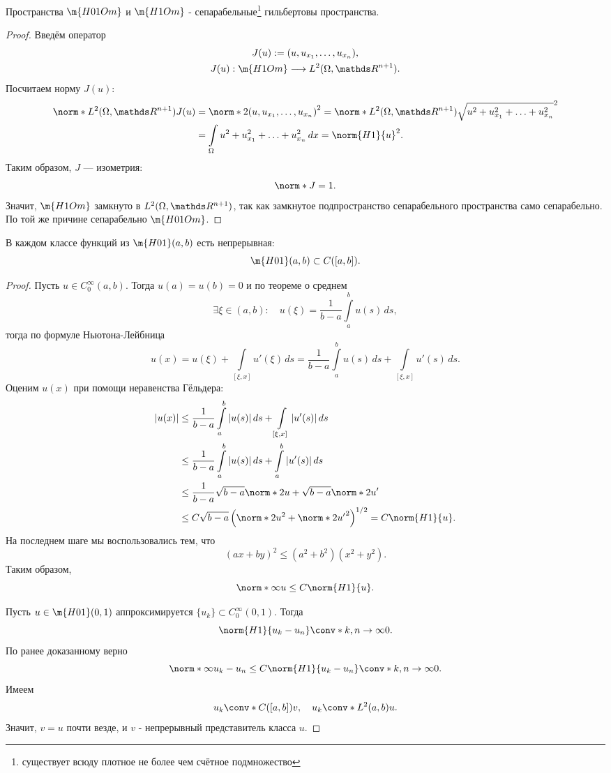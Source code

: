 \begin{theorem} Пространства $\m{H01Om}$ и  $\m{H1Om}$ - сепарабельные\footnote{существует всюду плотное не более чем счётное подмножество} гильбертовы пространства.
\end{theorem}
\begin{proof}
Введём оператор
\begin{gather*}
J(u) := (u, u_{x_1}, \hdots, u_{x_n}), \\ 
J(u):  \m{H1Om} \longrightarrow L^2(\Omega, \real^{n+1}).
\end{gather*}
Посчитаем норму $J(u)$:
\begin{align*}
	\norm*{L^2(\Omega, \real^{n+1})} {J(u)} &= \norm*{2}{(u, u_{x_1}, \hdots, u_{x_n})}^2 = \norm*{L^2(\Omega, \real^{n+1})}{\sqrt{u^2 + u_{x_1}^2 + \hdots + u_{x_n}^2 }}^2 \\
	&= \int \limits_\Omega u^2 + u_{x_1}^2 + \hdots + u_{x_n}^2 \, dx = \norm{H1}{u}^2.
\end{align*}
Таким образом, $J$ --- изометрия:
$$ \norm*{}{J} = 1.$$
Значит, $\m{H1Om}$ замкнуто в $L^2(\Omega, \real^{n+1})$, так как замкнутое подпространство сепарабельного пространства само сепарабельно. По той же причине сепарабельно $\m{H01Om}$.

\end{proof}

\begin{theorem} В каждом классе функций из $\m{H01}(a,b)$ есть непрерывная:
 $$ \m{H01}(a,b) \subset C([a,b]) .$$
\end{theorem}
\begin{proof}
Пусть $u \in C_0^\infty (a,b)$. Тогда $u(a) = u(b) = 0$ и по теореме о среднем
$$ \exists \xi \in (a,b): \quad u(\xi) = \frac{1}{b-a} \int \limits_a^b u(s) \, ds,$$
тогда по формуле Ньютона-Лейбница
$$ u(x) = u(\xi) + \int \limits_{[\xi, x]} u'(\xi) \, ds = \frac {1} {b-a} \int \limits_a^b u(s) \, ds + \int \limits_{[\xi, x]} u'(s) \, ds.$$
Оценим $u(x)$ при помощи неравенства Гёльдера:
\begin{align*}
|u(x)| &\leq \frac {1} {b-a} \int \limits_a^b |u(s)| \, ds + \int \limits_{[\xi, x]} |u'(s)| \, ds \\
&\leq \frac {1} {b-a} \int \limits_a^b |u(s)| \, ds + \int \limits_a^b |u'(s)| \, ds \\
&\leq \frac {1} {b-a} \sqrt{b-a} \norm*{2}{u} + \sqrt{b-a} \norm*{2}{u'} \\
&\leq C \sqrt{b-a} \left( \norm*{2}{u}^2 + \norm*{2}{u'}^2 \right)^{1/2} = C \norm{H1}{u}.
\end{align*}
На последнем шаге мы воспользовались тем, что
$$ (ax + by)^2 \leq (a^2 + b^2) (x^2 + y^2).$$
Таким образом,
$$ \norm*{\infty}{u} \leq C \norm{H1}{u}.$$

Пусть $u \in \m{H01} (0,1)$ аппроксимируется $\{ u_k \} \subset C_0^\infty (0,1)$. Тогда
$$ \norm{H1}{u_k - u_n} \conv*{}{k,n \to \infty} 0.$$
По ранее доказанному верно 
$$ \norm*{\infty}{u_k - u_n} \leq C \norm{H1}{u_k - u_n} \conv*{}{k,n \to \infty} 0.$$
Имеем 
$$ u_k \conv*{C([a,b])}{} v, \quad u_k \conv*{L^2(a,b)}{} u.$$
Значит, $v = u$ почти везде, и $v$ - непрерывный представитель класса $u$.  

\end{proof}


